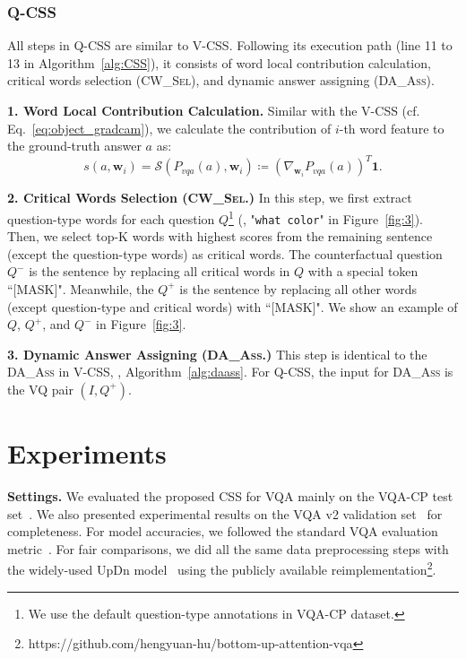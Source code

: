 \documentclass[10pt,twocolumn,letterpaper]{article}
\begin{document}
\subsubsection{Q-CSS}
All steps in Q-CSS are similar to V-CSS. Following its execution path (line 11 to 13 in Algorithm~\ref{alg:CSS}), it consists of word local contribution calculation, critical words selection (\textsc{CW\_Sel}), and dynamic answer assigning (\textsc{DA\_Ass}).

\textbf{1. Word Local Contribution Calculation.} Similar with the V-CSS (cf. Eq.~\eqref{eq:object_gradcam}), we calculate the contribution of $i$-th word feature to the ground-truth answer $a$ as:
\begin{equation} \label{eq:word_gradcam}
s(a, \bm{w}_i) = \mathcal{S}(P_{vqa}(a), \bm{w}_i) \coloneqq (\nabla_{\bm{w}_i} P_{vqa}(a))^T\mathbf{1}.
\end{equation}

\textbf{2. Critical Words Selection (\textsc{CW\_Sel}.)}  In this step, we first extract question-type words for each question $Q$\footnote{We use the default question-type annotations in VQA-CP dataset.} (\eg, "\texttt{what color}" in Figure~\ref{fig:3}). Then, we select top-K words with highest scores from the remaining sentence (except the question-type words) as critical words. The counterfactual question $Q^-$ is the sentence by replacing all critical words in $Q$ with a special token ``[MASK]". Meanwhile, the $Q^+$ is the sentence by replacing all other words (except question-type and critical words) with ``[MASK]". We show an example of $Q$, $Q^+$, and $Q^-$ in Figure~\ref{fig:3}.

\textbf{3. Dynamic Answer Assigning (\textsc{DA\_Ass}.)} This step is identical to the \textsc{DA\_Ass} in V-CSS, \ie, Algorithm~\ref{alg:daass}. For Q-CSS, the input for \textsc{DA\_Ass} is the VQ pair $(I, Q^+)$.

\section{Experiments}

\noindent\textbf{Settings.} We evaluated the proposed CSS for VQA mainly on the VQA-CP test set~\cite{agrawal2018don}. We also presented experimental results on the VQA v2 validation set~\cite{goyal2017making} for completeness. For model accuracies, we followed the standard  VQA evaluation metric~\cite{antol2015vqa}. For fair comparisons, we did all the same data preprocessing steps with the widely-used UpDn model~\cite{anderson2018bottom} using the publicly available reimplementation\footnote{https://github.com/hengyuan-hu/bottom-up-attention-vqa}. 
\end{document}
